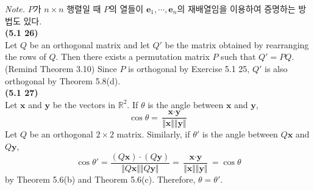 \textit{Note.} $P$가 $n \times n$ 행렬일 때 $P$의 열들이 $\textbf{e}
_1, \cdots, \textbf{e}_n$의 재배열임을 이용하여 증명하는 방법도 있다. \\

\textbf{(5.1 26)} \\
Let $Q$ be an orthogonal matrix and let $Q'$ be the matrix obtained by rearranging the rows of $Q$. Then there exists a permutation matrix $P$ such that $Q' = PQ$. (Remind Theorem 3.10) Since $P$ is orthogonal by Exercise 5.1 25, $Q'$ is also orthogonal by Theorem 5.8(d). \\

\textbf{(5.1 27)} \\
Let $\textbf{x}$ and $\textbf{y}$ be the vectors in $\mathbb{R}^2$. If $\theta$ is the angle between $\textbf{x}$ and $\textbf{y}$, \begin{equation*}
	\cos \theta = \frac{\textbf{x} \cdot \textbf{y}}{\Vert \textbf{x} \Vert \Vert \textbf{y} \Vert}
\end{equation*}
Let $Q$ be an orthogonal $2 \times 2$ matrix. Similarly, if $\theta'$ is the angle between $Q\textbf{x}$ and $Q\textbf{y}$, \begin{equation*}
	\cos \theta ' = \frac{(Q\textbf{x}) \cdot (Q\textbf{y})}{\Vert Q\textbf{x} \Vert \Vert Q\textbf{y} \Vert} = \frac{\textbf{x} \cdot \textbf{y}}{\Vert \textbf{x} \Vert \Vert \textbf{y} \Vert} = \cos \theta
\end{equation*} by Theorem 5.6(b) and Theorem 5.6(c). Therefore, $\theta = \theta '$. \\

